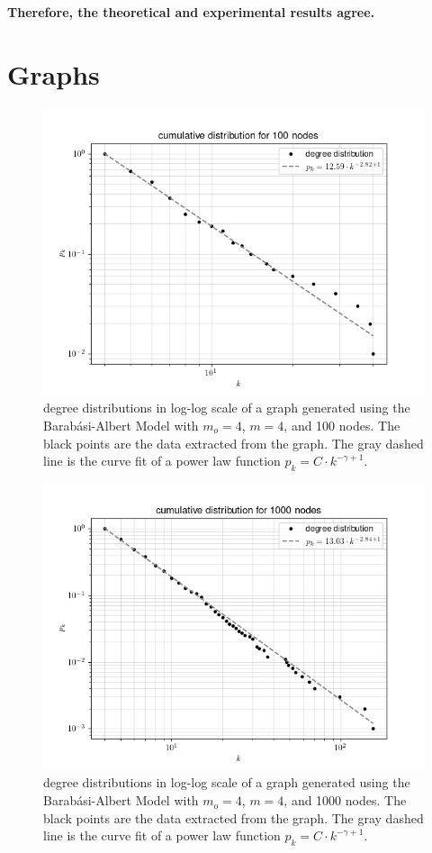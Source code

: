 \documentclass{article}
\newcommand{\scaleFreeFunction}{\ensuremath{p_k = C \cdot k^{-\gamma + 1}}}
\newcommand{\netDescription}[1]{degree distributions in log-log scale of a graph generated using the Barabási-Albert Model with $m_o = 4$, $m = 4$, and #1 nodes. The black points are the data extracted from the graph. The gray dashed line is the curve fit of a power law function \scaleFreeFunction.}
\begin{document}
\textbf{Therefore, the theoretical and experimental results agree.}

\section{Graphs}

\begin{figure}[!ht]
    \centering
    \includegraphics[width=\textwidth]{../result/all_degrees/100.png}
    \caption{\netDescription{100}}
    \label{figure:all-100}
\end{figure}

\begin{figure}[!ht]
    \centering
    \includegraphics[width=\textwidth]{../result/all_degrees/1000.png}
    \caption{\netDescription{1000}}
    \label{figure:all-1000}
\end{figure}
\end{document}

